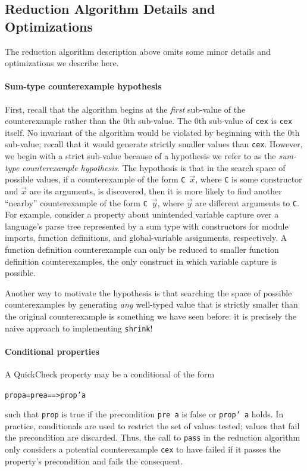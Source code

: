 \documentclass[10pt]{sigplanconf}
\newenvironment{code}{\begin{alltt}}{\end{alltt}}
\newcommand{\ttp}[1]{\texttt{#1}}
\begin{document}
\subsection{Reduction Algorithm Details and Optimizations}
The reduction algorithm description above omits some minor details and
optimizations we describe here.

\paragraph{Sum-type counterexample hypothesis}
First, recall that the algorithm begins at the \emph{first} sub-value of the
counterexample rather than the 0th sub-value.  The 0th sub-value of \ttp{cex} is
\ttp{cex} itself.  No invariant of the algorithm would be violated by beginning
with the 0th sub-value; recall that it would generate strictly smaller values
than \ttp{cex}.  However, we begin with a strict sub-value because of a
hypothesis we refer to as the \emph{sum-type counterexample hypothesis}.  The
hypothesis is that in the search space of possible values, if a counterexample
of the form \ttp{C}~$\vec{x}$, where \ttp{C} is some constructor and $\vec{x}$
are its arguments, is discovered, then it is more likely to find another
``nearby'' counterexample of the form \ttp{C}~$\vec{y}$, where $\vec{y}$ are
different arguments to \ttp{C}.  For example, consider a property about
unintended variable capture over a language's parse tree represented by a sum
type with constructors for module imports, function definitions, and
global-variable assignments, respectively.  A function definition counterexample
can only be reduced to smaller function definition counterexamples, the only
construct in which variable capture is possible.

Another way to motivate the hypothesis is that searching the space of possible
counterexamples by generating \emph{any} well-typed value that is strictly
smaller than the original counterexample is something we have seen before: it is
precisely the naive approach to implementing \ttp{shrink}!

\paragraph{Conditional properties}
A QuickCheck property may be a conditional of the form
%
\begin{code}
prop a = pre a ==> prop' a
\end{code}
%
\noindent
such that \ttp{prop} is true if the precondition \ttp{pre a} is false or
\ttp{prop' a} holds.  In practice, conditionals are used to restrict the set of
values tested; values that fail the precondition are discarded.  Thus, the call
to \ttp{pass} in the reduction algorithm only considers a potential
counterexample \ttp{cex} to have failed if it passes the property's
precondition and fails the consequent.
\end{document}
